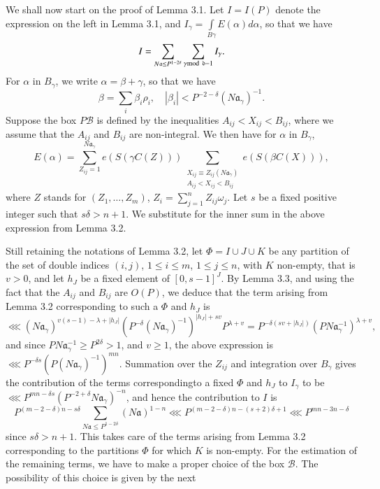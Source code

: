 We shall now start on the proof of Lemma 3.1. Let $I = I(P)$ denote the expression on the left in Lemma 3.1, and $I_{\gamma} = \int\limits_{B\gamma} E (\alpha) d \alpha$, so that we have
$$
I = \sum\limits_{N \mathfrak{a} \leq P^{1-2\delta} } \sum\limits_{\gamma {\rm{mod}}\kern.3em {\mathfrak{d}} -1} I_\gamma.
$$
For $\alpha$ in $B_\gamma$, we write $\alpha = \beta + \gamma$, so that we have
$$
\beta =\sum\limits_i \beta_i \rho_i, \quad |\beta_i| < P^{-2-\delta} (N \mathfrak{a}_\gamma)^{-1}.
$$
Suppose the box $P\mathscr{B}$ is defined by the inequalities $A_{ij } < X_{ij} < B_{ij}$, where we assume that the $A_{ij}$ and $B_{ij}$ are non-integral. We then have for $\alpha$ in $B_\gamma$,
\begin{equation*}
E (\alpha) = \sum\limits^{N\mathfrak{a}_\gamma}_{Z_{ij} =1} e (S (\gamma C (Z))) \sum\limits_{\substack{X_{ij} \equiv Z_{ij} (N \mathfrak{a}_\gamma)\\ A_{ij} < X_{ij} < B_{ij}}} e (S (\beta C (X))), \tag{9} 
\end{equation*}
where $Z$ stands for $(Z_1, \ldots, Z_m)$, $Z_i = \sum\limits^n_{j=1} Z_{ij} \omega_j$. Let $s$ be a fixed positive integer such that $s\delta > n +1 $. We substitute for the inner sum in the above expression from Lemma 3.2.

Still retaining the notations of Lemma 3.2, let $\Phi = I \cup J \cup K$ be any partition of the set of double indices $(i,j)$, $1 \leq i \leq m$, $1 \leq j \leq n$, with $K$ non-empty, that is $v>0$, and let $h_J$ be a fixed element of $[0, s-1]^J$. By Lemma 3.3, and using the fact that the $A_{ij}$ and $B_{ij}$ are $O(P)$, we deduce that the term arising from Lemma 3.2 corresponding to such a $\Phi$ and $h_J$ is
{\fontsize{10pt}{12pt}\selectfont
$$
\lll (N\mathfrak{a}_\gamma)^{v(s-1) - \lambda + |h_J|} (P^{-\delta} (N\mathfrak{a}_\gamma)^{-1})^{|h_J|+sv} P^{\lambda+v} = P^{-\delta (sv+|h_J|)} (PN \mathfrak{a}_{\gamma}^{-1})^{\lambda +v},
$$}\relax
and since $PN\mathfrak{a}^{-1}_\gamma \geq P^{2\delta} > 1$, and $v \geq 1$, the above expression is $\lll P^{-\delta s} (P (N\mathfrak{a}_\gamma)^{-1})^{mn}$. Summation over the $Z_{ij}$ and integration over $B_\gamma$ gives the contribution of the terms corresponding\pageoriginale to a fixed $\Phi$ and $h_J$ to $I_\gamma$ to be $\lll P^{mn -\delta s} (P^{-2 + \delta} N\mathfrak{a}_\gamma)^{-n}$, and hence the contribution to $I$ is
$$
P^{(m-2-\delta) n-s\delta} \sum\limits_{N \mathfrak{a} \leq P^{1-2\delta}} (N\mathfrak{a})^{1-n} \lll P^{(m-2-\delta) n - (s+2)\delta+1} \lll P^{mn-3n-\delta}
$$
since $s\delta > n+1$. This takes care of the terms arising from Lemma 3.2 corresponding to the partitions $\Phi$ for which $K$ is non-empty. For the estimation of the remaining terms, we have to make a proper choice of the box $\mathscr{B}$. The possibility of this choice is given by the next

